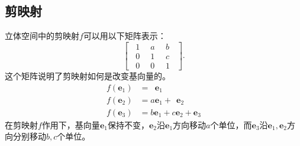 \documentclass[12pt,UTF8,fontset=none]{ctexbook}
\begin{document}
\subsection{剪映射}
立体空间中的剪映射$f$可以用以下矩阵表示：
$$ \begin{bmatrix}
    \phantom{0}1 & \phantom{0}a\phantom{0} & b\phantom{0} \\ \phantom{0}0 & \phantom{0}1\phantom{0} & c\phantom{0} \\ \phantom{0}0 & \phantom{0}0\phantom{0} & 1\phantom{0}
\end{bmatrix}. $$
这个矩阵说明了剪映射如何是改变基向量的。
\begin{align*}
    f(\mathbf{e}_1) &= \phantom{a}\mathbf{e}_1 \\
    f(\mathbf{e}_2) &= a\mathbf{e}_1 + \phantom{c}\mathbf{e}_2 \\
    f(\mathbf{e}_3) &= b\mathbf{e}_1 + c\mathbf{e}_2 + \mathbf{e}_3 
\end{align*}
在剪映射$f$作用下，基向量$\mathbf{e}_1$保持不变，$\mathbf{e}_2$沿$\mathbf{e}_1$方向移动$a$个单位，而$\mathbf{e}_3$沿$\mathbf{e}_1, \mathbf{e}_2$方向分别移动$b,c$个单位。
\end{document}
